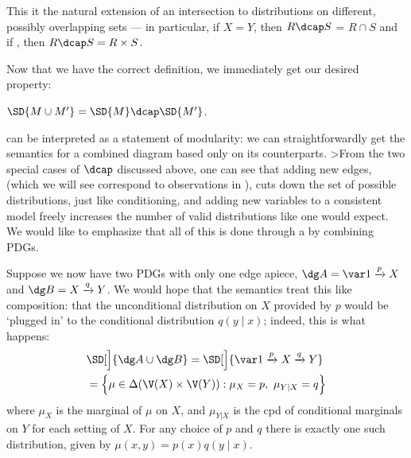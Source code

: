 {\begin{defn}[$\dcap$]
    	This it the natural extension of an intersection to distributions on different, possibly overlapping sets --- in particular, if $X = Y$, then $R \dcap S$ = $R \cap S$ and if , then $R \dcap S = R \times S$. 
    \end{defn}


    Now that we have the correct definition, we immediately get our desired property:

    \begin{prop}\label{prop:union-set-semantics}
    	$\SD{M \cup M'} = \SD{M} \dcap \SD{M'}$.
    \end{prop}

     can be interpreted as a statement of modularity: we can straightforwardly get the semantics for a combined diagram based only on its counterparts. 
    >From the two special cases of $\dcap$ discussed above, one can see that adding new edges, (which we will see correspond to observations in ), cuts down the set of possible distributions, just like conditioning, and adding new variables to a consistent model freely increases the number of valid distributions like one would expect. We would like to emphasize that all of this is done through a by combining PDGs.

    \begin{example}\label{ex:sd-compose-unconditional}
    	Suppose we now have two PDGs with only one edge apiece, $\dg A = {\var 1} \xrightarrow{p} X$ and $\dg B = X \xrightarrow{q} Y$. We would hope that the semantics treat this like composition: that the unconditional distribution on $X$ provided by $p$ would be `plugged in' to the conditional distribution $q(y \mid x)$; indeed, this is what happens:
    	\begin{align*}
    		&\SD[\Big]{{\dg A \cup \dg B}} = \SD[\Big]{{\var 1} \xrightarrow{p} X \xrightarrow{q} Y} \\
    			&= \Big\{  \mu \in \Delta(\V(X) \times \V(Y)) : \mu_X = p,~\mu_{Y|X} = q \Big\} 
    	\end{align*}
    	where $\mu_X$ is the marginal of $\mu$ on $X$, and $\mu_{Y|X}$ is the cpd of conditional marginals on $Y$ for each setting of $X$.
    	For any choice of $p$ and $q$ there is exactly one such distribution, given by $\mu(x,y) = p(x) q(y \mid x)$.
    \end{example}


}
